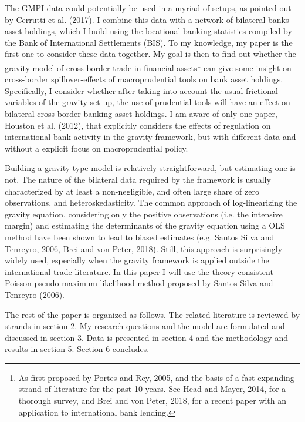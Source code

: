 \documentclass[12pt,a4paper]{article}
\begin{document}
The GMPI data could potentially be used in a myriad of setups, as pointed out by Cerrutti et al. (2017). I combine this data with a network of bilateral banks asset holdings, which I build using the locational banking statistics compiled by the Bank of International Settlements (BIS). To my knowledge, my paper is the first one to consider these data together. My goal is then to find out whether the gravity model of cross-border trade in financial assets\footnote{As first proposed by Portes and Rey, 2005, and the basis of a fast-expanding strand of literature for the past 10 years. See Head and Mayer, 2014, for a thorough survey, and Brei and von Peter, 2018, for a recent paper with an application to international bank lending.} can give some insight on cross-border spillover-effects of macroprudential tools on bank asset holdings. Specifically, I consider whether after taking into account the usual frictional variables of the gravity set-up, the use of prudential tools will have an effect on bilateral cross-border banking asset holdings. I am aware of only one paper, Houston et al. (2012), that explicitly considers the effects of regulation on international bank activity in the gravity framework, but with different data and without a explicit focus on macroprudential policy. 

Building a gravity-type model is relatively straightforward, but estimating one is not. The nature of the bilateral data required by the framework is usually characterized by at least a non-negligible, and often large share of zero observations, and heteroskedasticity. The common approach of log-linearizing the gravity equation, considering only the positive observations (i.e. the intensive margin) and estimating the determinants of the gravity equation using a OLS method have been shown to lead to biased estimates (e.g. Santos Silva and Tenreyro, 2006, Brei and von Peter, 2018). Still, this approach is surprisingly widely used, especially when the gravity framework is applied outside the international trade literature. In this paper I will use the theory-consistent Poisson pseudo-maximum-likelihood method proposed by Santos Silva and Tenreyro (2006). 

The rest of the paper is organized as follows. The related literature is reviewed by strands in section 2. My research questions and the model are formulated and discussed in section 3. Data is presented in section 4 and the methodology and results in section 5. Section 6 concludes. 
\end{document}
